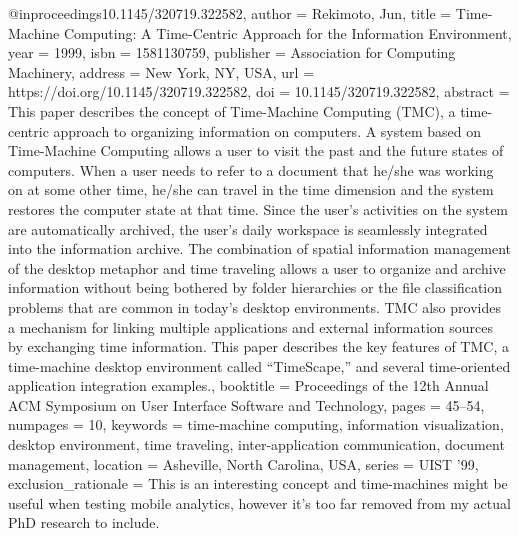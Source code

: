 @inproceedings{10.1145/320719.322582,
    author = {Rekimoto, Jun},
    title = {Time-Machine Computing: A Time-Centric Approach for the Information Environment},
    year = {1999},
    isbn = {1581130759},
    publisher = {Association for Computing Machinery},
    address = {New York, NY, USA},
    url = {https://doi.org/10.1145/320719.322582},
    doi = {10.1145/320719.322582},
    abstract = {This paper describes the concept of Time-Machine Computing (TMC), a time-centric approach
    to organizing information on computers. A system based on Time-Machine Computing allows
    a user to visit the past and the future states of computers. When a user needs to
    refer to a document that he/she was working on at some other time, he/she can travel
    in the time dimension and the system restores the computer state at that time. Since
    the user's activities on the system are automatically archived, the user's daily workspace
    is seamlessly integrated into the information archive. The combination of spatial
    information management of the desktop metaphor and time traveling allows a user to
    organize and archive information without being bothered by folder hierarchies or the
    file classification problems that are common in today's desktop environments. TMC
    also provides a mechanism for linking multiple applications and external information
    sources by exchanging time information. This paper describes the key features of TMC,
    a time-machine desktop environment called “TimeScape,” and several time-oriented application
    integration examples.},
    booktitle = {Proceedings of the 12th Annual ACM Symposium on User Interface Software and Technology},
    pages = {45–54},
    numpages = {10},
    keywords = {time-machine computing, information visualization, desktop environment, time traveling, inter-application communication, document management},
    location = {Asheville, North Carolina, USA},
    series = {UIST '99},
    exclusion_rationale = {This is an interesting concept and time-machines might be useful when testing mobile analytics, however it's too far removed from my actual PhD research to include.}
}

